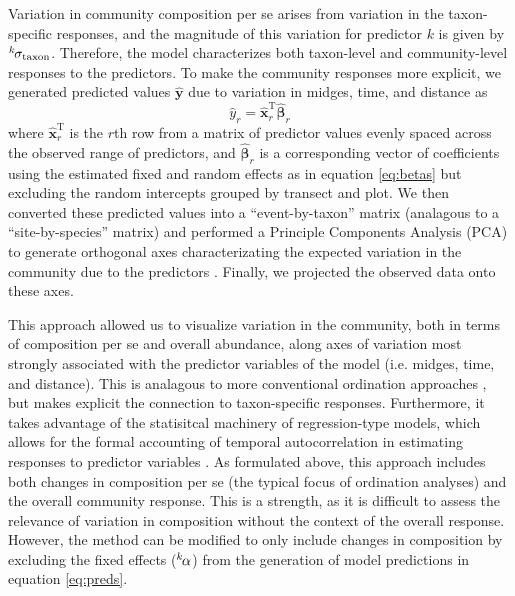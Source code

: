 Variation in community composition per se arises from variation in the taxon-specific
responses, and the magnitude of this
variation for predictor $k$ is given by ${}^k\hspace*{-1pt}\sigma_\text{taxon}$.
Therefore, the model characterizes both
taxon-level and community-level responses to the predictors.
To make the community responses more explicit, we generated predicted values
$\hat{\mathbf{y}}$ due to variation in midges, time, and distance as
%
\begin{equation} \label{eq:preds}
    \hat{y}_r = \hat{\mathbf{x}}_r^\text{T} \hat{{\boldsymbol\beta}}_r
\end{equation}
%
\noindent where $\hat{\mathbf{x}}_r^\text{T}$ is the $r$th row from a matrix
of predictor values evenly spaced across the observed range of predictors,
and $\hat{{\boldsymbol\beta}}_r$ is a corresponding vector of coefficients
using the estimated fixed and random effects as in equation \ref{eq:betas}
but excluding the random intercepts grouped
by transect and plot.
We then converted these predicted values into a ``event-by-taxon'' matrix
(analagous to a ``site-by-species'' matrix) \citep{Mcgarigal2013}
and performed a Principle Components Analysis (PCA) to
generate orthogonal axes characterizating the expected
variation in the community due to the predictors \citep[similar to][]{Jackson2012}.
Finally, we projected the observed data onto these axes.

This approach allowed us to visualize variation in the community, both in terms of
composition per se and overall abundance, along axes of variation most
strongly associated with the predictor variables of the model
(i.e. midges, time, and distance).
This is analagous to more conventional ordination approaches \citep{Mcgarigal2013},
but makes explicit the connection to taxon-specific responses.
Furthermore, it takes advantage  of the statisitcal machinery of
regression-type models, which allows for the formal accounting of temporal
autocorrelation in estimating responses to predictor variables \citep{Ives2006}.
As formulated above, this approach includes both changes in composition per se
(the typical focus of ordination analyses) and the overall community response.
This is a strength, as it is difficult to assess the relevance of variation in
composition without the context of the overall response.
However, the method can be modified to only include changes in composition
by excluding the fixed effects (${}^k\hspace*{-1pt}\alpha$)
from the generation of model predictions in equation \ref{eq:preds}.

